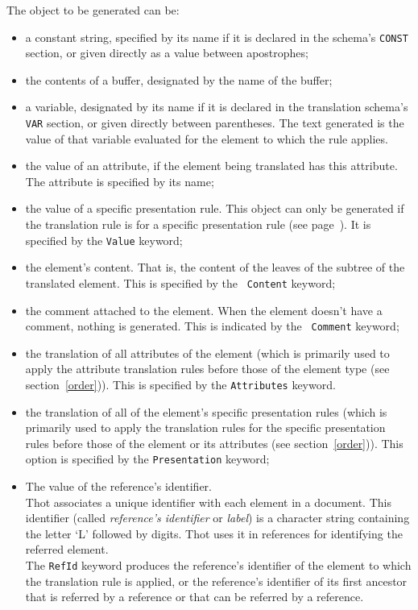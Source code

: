The object to be generated can be:
\begin{itemize}
\item a constant string, specified by its name if it is declared in
the schema's {\tt CONST} section, or given directly as a value between
apostrophes;

\item the contents of a buffer, designated by the name of the buffer;

\item a variable, designated by its name if it is declared in the
translation schema's {\tt VAR} section, or given directly between
parentheses.  The text generated is the value of that variable
evaluated for the element to which the rule applies.

\item the value of an attribute, if the element being translated has this
attribute.  The attribute is specified by its name;

\item the value of a specific presentation rule.  This object can only
be generated if the translation rule is for a specific presentation
rule (see page~\pageref{valpres}).  It is specified by the {\tt Value}
keyword;

\item the element's content.  That is, the content of the leaves of
the subtree of the translated element.  This is specified by the {\tt
Content} keyword;

\item the comment attached to the element.  When the element doesn't
have a comment, nothing is generated.  This is indicated by the {\tt
Comment} keyword;

\item the translation of all attributes of the element (which is
primarily used to apply the attribute translation rules before those
of the element type (see section~\ref{order})).  This is
specified by the {\tt Attributes} keyword.

\item the translation of all of the element's specific presentation
rules (which is primarily used to apply the translation rules for the
specific presentation rules before those of the element or its
attributes (see section~\ref{order})).  This option is specified
by the {\tt Presentation} keyword;

\item  The value of the reference's identifier. \\
Thot associates a unique identifier with each element in a document.  This
identifier (called {\it reference's identifier} or {\it label}) is a
character string containing the letter `L' followed by digits.  Thot uses it
in references for identifying the referred element. \\
The {\tt RefId} keyword produces the reference's identifier
of the element to which the translation rule is applied, or the reference's
identifier of its first ancestor that is referred by a reference
or that can be referred by a reference.


\end{itemize}
